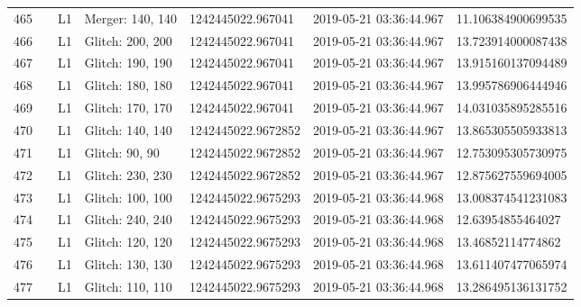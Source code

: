 \begin{longtable}{lllllll}
465  &                                                    &       L1 &  Merger: 140, 140 &   1242445022.967041 &  2019-05-21 03:36:44.967 &  11.106384900699535 \\
466  &                                                    &       L1 &  Glitch: 200, 200 &   1242445022.967041 &  2019-05-21 03:36:44.967 &  13.723914000087438 \\
467  &                                                    &       L1 &  Glitch: 190, 190 &   1242445022.967041 &  2019-05-21 03:36:44.967 &  13.915160137094489 \\
468  &                                                    &       L1 &  Glitch: 180, 180 &   1242445022.967041 &  2019-05-21 03:36:44.967 &  13.995786906444946 \\
469  &                                                    &       L1 &  Glitch: 170, 170 &   1242445022.967041 &  2019-05-21 03:36:44.967 &  14.031035895285516 \\
470  &                                                    &       L1 &  Glitch: 140, 140 &  1242445022.9672852 &  2019-05-21 03:36:44.967 &  13.865305505933813 \\
471  &                                                    &       L1 &    Glitch: 90, 90 &  1242445022.9672852 &  2019-05-21 03:36:44.967 &  12.753095305730975 \\
472  &                                                    &       L1 &  Glitch: 230, 230 &  1242445022.9672852 &  2019-05-21 03:36:44.967 &  12.875627559694005 \\
473  &                                                    &       L1 &  Glitch: 100, 100 &  1242445022.9675293 &  2019-05-21 03:36:44.968 &  13.008374541231083 \\
474  &                                                    &       L1 &  Glitch: 240, 240 &  1242445022.9675293 &  2019-05-21 03:36:44.968 &   12.63954855464027 \\
475  &                                                    &       L1 &  Glitch: 120, 120 &  1242445022.9675293 &  2019-05-21 03:36:44.968 &   13.46852114774862 \\
476  &                                                    &       L1 &  Glitch: 130, 130 &  1242445022.9675293 &  2019-05-21 03:36:44.968 &  13.611407477065974 \\
477  &                                                    &       L1 &  Glitch: 110, 110 &  1242445022.9675293 &  2019-05-21 03:36:44.968 &  13.286495136131752 \\

\end{longtable}
